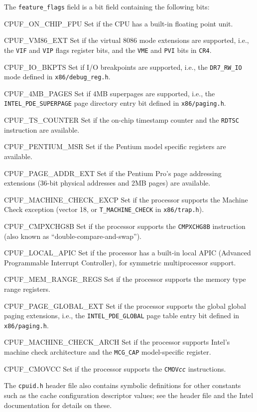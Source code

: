 \begin{apidesc}
	The {\tt feature_flags} field is a bit field
	containing the following bits:
	\begin{icsymlist}
	\item[CPUF_ON_CHIP_FPU]
		Set if the CPU has a built-in floating point unit.
	\item[CPUF_VM86_EXT]
		Set if the virtual 8086 mode extensions are supported,
		i.e., the {\tt VIF} and {\tt VIP} flags register bits,
		and the {\tt VME} and {\tt PVI} bits in {\tt CR4}.
	\item[CPUF_IO_BKPTS]
		Set if I/O breakpoints are supported,
		i.e., the {\tt DR7_RW_IO} mode defined in {\tt x86/debug_reg.h}.
	\item[CPUF_4MB_PAGES]
		Set if 4MB superpages are supported,
		i.e., the {\tt INTEL_PDE_SUPERPAGE} page directory entry bit
		defined in {\tt x86/paging.h}.
	\item[CPUF_TS_COUNTER]
		Set if the on-chip timestamp counter
		and the {\tt RDTSC} instruction are available.
	\item[CPUF_PENTIUM_MSR]
		Set if the Pentium model specific registers are available.
	\item[CPUF_PAGE_ADDR_EXT]
		Set if the Pentium Pro's page addressing extensions
		(36-bit physical addresses and 2MB pages) are available.
	\item[CPUF_MACHINE_CHECK_EXCP]
		Set if the processor supports the Machine Check exception
		(vector 18, or {\tt T_MACHINE_CHECK} in {\tt x86/trap.h}).
	\item[CPUF_CMPXCHG8B]
		Set if the processor supports the {\tt CMPXCHG8B} instruction
		(also known as ``double-compare-and-swap'').
	\item[CPUF_LOCAL_APIC]
		Set if the processor has a built-in local APIC
		(Advanced Programmable Interrupt Controller),
		for symmetric multiprocessor support.
	\item[CPUF_MEM_RANGE_REGS]
		Set if the processor supports the memory type range registers.
	\item[CPUF_PAGE_GLOBAL_EXT]
		Set if the processor supports
		the global global paging extensions,
		i.e., the {\tt INTEL_PDE_GLOBAL} page table entry bit
		defined in {\tt x86/paging.h}.
	\item[CPUF_MACHINE_CHECK_ARCH]
		Set if the processor supports Intel's machine check architecture
		and the {\tt MCG_CAP} model-specific register.
	\item[CPUF_CMOVCC]
		Set if the processor supports the {\tt CMOV\emph{cc}} instructions.
	\end{icsymlist}

	The {\tt cpuid.h} header file also contains symbolic definitions
	for other constants such as the cache configuration descriptor values;
	see the header file and the Intel documentation for details on these.
\end{apidesc}

